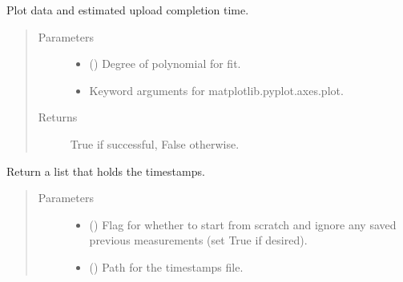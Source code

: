 \documentclass[letterpaper,10pt,english]{sphinxmanual}
\begin{document}
\begin{fulllineitems}

\begin{fulllineitems}
\label{\detokenize{src:src.timer.TimeIt.plot_it}}
Plot data and estimated upload completion time.
\begin{quote}\begin{description}
\item[{Parameters}] \leavevmode\begin{itemize}
\item {} 
 () \textendash{} Degree of polynomial for fit.

\item {} 
 \textendash{} Keyword arguments for matplotlib.pyplot.axes.plot.

\end{itemize}

\item[{Returns}] \leavevmode
True if successful, False otherwise.

\end{description}\end{quote}

\end{fulllineitems}


\begin{fulllineitems}
\label{\detokenize{src:src.timer.TimeIt.read_time_data}}
Return a list that holds the timestamps.
\begin{quote}\begin{description}
\item[{Parameters}] \leavevmode\begin{itemize}
\item {} 
 () \textendash{} Flag for whether to start from scratch and ignore any
saved previous measurements (set True if desired).

\item {} 
 () \textendash{} Path for the timestamps file.

\end{itemize}


\end{description}
\end{quote}
\end{fulllineitems}
\end{fulllineitems}
\end{document}
